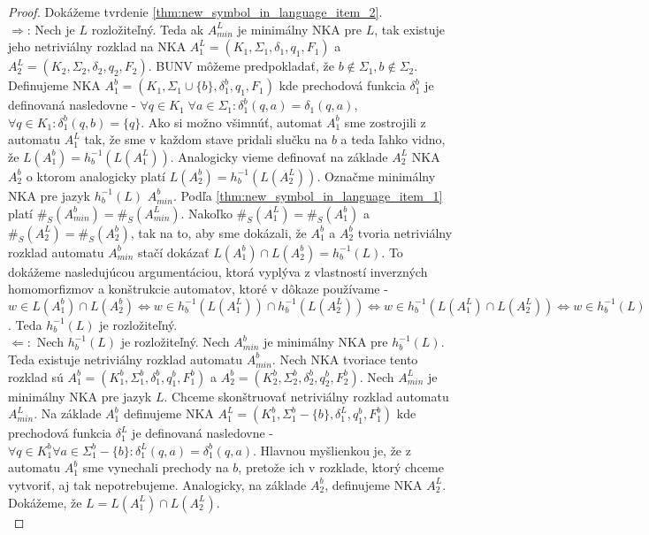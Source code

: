 \begin{proof}
\par
Dokážeme tvrdenie \ref{thm:new_symbol_in_language_item_2}. \\
$ \Rightarrow $: Nech je $ L $ rozložiteľný. Teda ak $ A_{min}^L $ je minimálny NKA pre $ L $, tak existuje jeho netriviálny rozklad na NKA $ A_1^{L}=(K_1, \Sigma_1, \delta_1, q_1, F_1) $ a $ A_2^{L}=(K_2, \Sigma_2, \delta_2, q_2, F_2) $. BUNV môžeme predpokladať, že $ b \notin \Sigma_1,b \notin \Sigma_2 $.  Definujeme NKA $ A_1^{b} = (K_1, \Sigma_1 \cup \lbrace b \rbrace, \delta_1^b, q_1, F_1) $ kde prechodová funkcia $ \delta_1^b $ je definovaná nasledovne - $ \forall q \in K_1 \; \forall a \in \Sigma_1: \delta_1^b(q,a)=\delta_1(q,a) $, $ \forall q \in K_1 : \delta_1^b(q,b) =  \lbrace q \rbrace$. Ako si možno všimnúť, automat $ A_1^{b} $ sme zostrojili z automatu $ A_1^L $ tak, že sme v každom stave pridali slučku na $ b $ a teda ľahko vidno, že $ L(A_1^{b}) = h_{b}^{-1}(L(A_1^L)) $. Analogicky vieme definovať na základe $ A_2^L $ NKA $ A_2^{b} $ o ktorom analogicky platí $ L(A_2^{b}) = h_{b}^{-1}(L(A_2^L)) $. Označme minimálny NKA pre jazyk $ h_b^{-1}(L) $ $ A_{min}^b $. Podľa \ref{thm:new_symbol_in_language_item_1} platí $ \#_S(A_{min}^b) = \#_S(A_{min}^L) $. Nakoľko $ \#_S(A_1^L) = \#_S(A_1^b) $ a $ \#_S(A_2^L) = \#_S(A_2^b) $, tak na to, aby sme dokázali, že $ A_1^b $ a $ A_2^b $ tvoria netriviálny rozklad automatu $ A_{min}^b $ stačí dokázať $ L(A_1^b) \cap L(A_2^b) = h_b^{-1}(L) $. To dokážeme nasledujúcou argumentáciou, ktorá vyplýva z vlastností inverzných homomorfizmov a konštrukcie automatov, ktoré v dôkaze používame - $ w \in L(A_1^b) \cap L(A_2^b) \Leftrightarrow w \in h_b^{-1}(L(A_1^L)) \cap h_b^{-1}(L(A_2^L)) \Leftrightarrow w \in h_b^{-1}(L(A_1^L) \cap L(A_2^L)) \Leftrightarrow w \in h_b^{-1}(L) $. Teda $ h_b^{-1}(L) $ je rozložiteľný. \\
$ \Leftarrow: $ Nech $ h_b^{-1}(L) $ je rozložiteľný. Nech $ A^b_{min} $ je minimálny NKA pre $ h_b^{-1}(L) $. Teda existuje netriviálny rozklad automatu $ A^b_{min} $. Nech NKA tvoriace tento rozklad sú $ A_1^b = (K_1^b,\Sigma_1^b,\delta_1^b,q_1^b,F_1^b) $ a $ A_2^b = (K_2^b,\Sigma_2^b,\delta_2^b,q_2^b,F_2^b) $. Nech $ A^L_{min} $ je minimálny NKA pre jazyk $ L $. Chceme skonštruovať netriviálny rozklad automatu $ A^L_{min} $. Na základe $ A_1^b $ definujeme NKA $ A_1^L = (K_1^b,\Sigma_1^b - \lbrace b \rbrace,\delta_1^L,q_1^b,F_1^b) $ kde prechodová funkcia $ \delta_1^L $ je definovaná nasledovne - $ \forall q \in K_1^b \forall a \in \Sigma_1^b - \lbrace b \rbrace : \delta_1^L(q,a) = \delta_1^b(q,a) $. Hlavnou myšlienkou je, že z automatu $ A_1^b $ sme vynechali prechody na $ b $, pretože ich v rozklade, ktorý chceme vytvoriť, aj tak nepotrebujeme. Analogicky, na základe $ A_2^b $, definujeme NKA $ A_2^L $. Dokážeme, že $ L = L(A_1^L) \cap L(A_2^L) $. \\

\end{proof}
